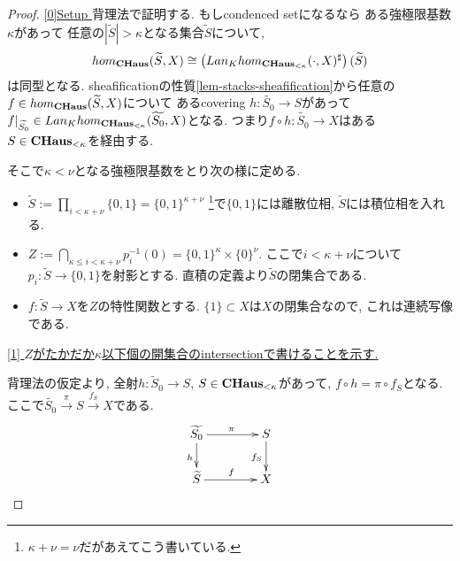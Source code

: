 \documentclass[dvipdfmx,a4paper,11pt]{report}
\newcommand{\colim}{{\rm colim}}
\theoremstyle{definition}
\begin{document}
 \begin{proof}

\underline{[0]Setup }
 背理法で証明する. 
もしcondenced setになるなら
 ある強極限基数$\kappa$があって
任意の$|\widetilde{S}|> \kappa$となる集合$\widetilde{S}$について,
$$
hom_{{\bf CHaus}}(\widetilde{S},  X) 
\cong   \left( Lan_{K}hom_{{\bf CHaus}_{< \kappa}}(\cdot,  X )^{\sharp} \right)(\widetilde{S})
$$
は同型となる. 
sheafificationの性質\ref{lem-stacks-sheafification}から任意の$f \in hom_{{\bf CHaus}}(\widetilde{S},  X) $について
あるcovering $h : \widetilde{S_0} \to S$があって
$f|_{\widetilde{S_0}} \in  Lan_{K}
hom_{{\bf CHaus}_{< \kappa}}(\widetilde{S_0},  X )$となる.
つまり$f \circ h : \widetilde{S_0} \to X$はある$S \in {\bf CHaus}_{< \kappa}$を経由する. 



そこで$\kappa < \nu$となる強極限基数をとり次の様に定める.
\begin{itemize}
\item $\widetilde{S} := \prod_{i < \kappa +\nu} \{0,1\} =\{0,1\}^{\kappa + \nu}$ \footnote{$\kappa + \nu=\nu$だがあえてこう書いている. }で$\{ 0,1\}$には離散位相, $\widetilde{S}$には積位相を入れる.
\item  $Z := \bigcap_{\kappa \le  i < \kappa +\nu} p^{-1}_{i}(0) = \{0,1\}^{\kappa} \times \{ 0\}^{\nu}$. ここで$i < \kappa +\nu$について$p_i : \widetilde{S} \to \{0,1 \}$を射影とする. %
直積の定義より$\widetilde{S}$の閉集合である.
\item $f : \widetilde{S} \to X$を$Z$の特性関数とする. $\{1\} \subset X$は$X$の閉集合なので, これは連続写像である. 
\end{itemize}

\underline{[1] $Z$がたかだか$\kappa$以下個の開集合のintersectionで書けることを示す.} 

背理法の仮定より, 全射$h : \widetilde{S}_0 \to S$,  $S \in {\bf CHaus}_{< \kappa}$があって, 
$f \circ h = \pi \circ f_{S}$となる. ここで$\widetilde{S_0} \overset{\pi}{\to} S \overset{f_S}{\to} X$である.
\begin{equation*}
\xymatrix@C=40pt@R=20pt{
\widetilde{S_0} \ar@{->}[d]_{h}\ar@{->}[r]^{\pi}
& S\ar@{->}[d]_{f_{S}}
\\
\widetilde{S} \ar@{->}[r]^{f}&
X
}
\end{equation*}


\end{proof}
\end{document}
